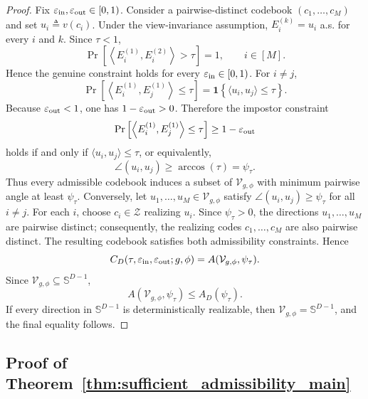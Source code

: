 \documentclass[journal]{IEEEtran}
\begin{document}
\begin{bibunit}
\begin{proof}
Fix $\varepsilon_{\rm in},\varepsilon_{\rm out}\in[0,1)$. Consider a pairwise-distinct codebook $(c_1,\ldots,c_M)$ and set $u_i\triangleq v(c_i)$. Under the view-invariance assumption, $E_i^{(k)}=u_i$ a.s. for every $i$ and $k$. Since $\tau<1$,
%
\begin{equation}
\Pr \left[ \left\langle E_i^{(1)},E_i^{(2)}\right\rangle>\tau
\right] =1, \qquad i\in[M].
\end{equation}
%
Hence the genuine constraint holds for every $\varepsilon_{\rm in}\in[0,1)$. For $i\ne j$,
%
\begin{equation}
\Pr \left[ \left\langle E_i^{(1)},E_j^{(1)}\right\rangle\le\tau \right]
= \mathbf 1 \left\{\langle u_i,u_j\rangle\le\tau\right\}.
\end{equation}
%
Because $\varepsilon_{\rm out}<1$, one has $1-\varepsilon_{\rm out}>0$. Therefore the impostor constraint
\[
\Pr \left[ \left\langle E_i^{(1)},E_j^{(1)}\right\rangle\le\tau \right]
\ge 1-\varepsilon_{\rm out}
\]
holds if and only if $\langle u_i,u_j\rangle\le\tau$, or equivalently,
\[
\angle(u_i,u_j)\ge\arccos(\tau)=\psi_\tau.
\]
%
Thus every admissible codebook induces a subset of $\mathcal V_{g,\phi}$ with minimum pairwise angle at least $\psi_\tau$. Conversely, let $u_1,\ldots,u_M\in\mathcal V_{g,\phi}$ satisfy $\angle(u_i,u_j)\ge\psi_\tau$ for all $i\ne j$. For each $i$, choose $c_i\in\mathcal Z$ realizing $u_i$. Since $\psi_\tau>0$, the directions $u_1,\ldots,u_M$ are pairwise distinct; consequently, the realizing codes $c_1,\ldots,c_M$ are also pairwise distinct. The resulting codebook satisfies both admissibility constraints. Hence
%
\begin{equation}
C_D(\tau,\varepsilon_{\rm in},\varepsilon_{\rm out};g,\phi) = A(\mathcal V_{g,\phi},\psi_\tau).
\end{equation}
%
Since $\mathcal V_{g,\phi}\subseteq\mathbb S^{D-1}$,
\[
A(\mathcal V_{g,\phi},\psi_\tau) \le A_D(\psi_\tau).
\]
If every direction in $\mathbb S^{D-1}$ is deterministically realizable, then $\mathcal V_{g,\phi}=\mathbb S^{D-1}$, and the final equality follows.
%
\end{proof}




\subsection{Proof of Theorem~\ref{thm:sufficient_admissibility_main}}
\label{app:proof_thm_sufficient_admissibility}


\end{bibunit}
\end{document}
